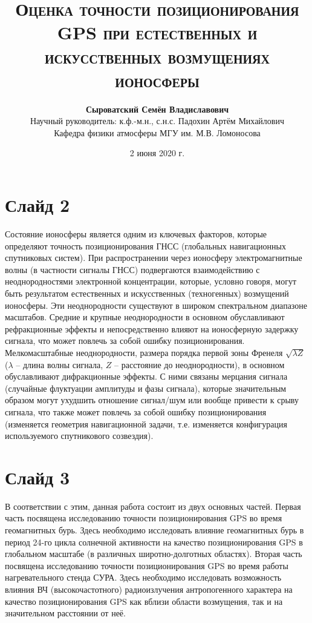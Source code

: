 \documentclass[a4paper,14pt]{extarticle}
\title{\textsc{Оценка точности позиционирования GPS при естественных и искусственных возмущениях ионосферы}}
\author{\textbf{Сыроватский Семён Владиславович} \\ {\small Научный руководитель: к.ф.-м.н., с.н.с. Падохин Артём Михайлович} \\[1em] Кафедра физики атмосферы МГУ им. М.В. Ломоносова}
\date{2 июня 2020 г.}
\begin{document}
\maketitle
\section*{Слайд 2}
Состояние ионосферы является одним из ключевых факторов, которые определяют точность позиционирования ГНСС (глобальных навигационных спутниковых систем).
При распространении через ионосферу электромагнитные волны (в частности сигналы ГНСС) подвергаются взаимодействию с неоднородностями электронной концентрации, которые, условно говоря, могут быть результатом естественных и искусственных (техногенных) возмущений ионосферы.
Эти неоднородности существуют в широком спектральном диапазоне масштабов.
Средние и крупные неоднородности в основном обуславливают рефракционные эффекты и непосредственно влияют на ионосферную задержку сигнала, что может повлечь за собой ошибку позиционирования.
Мелкомасштабные неоднородности, размера порядка первой зоны Френеля $\sqrt{\lambda Z}$ ($\lambda$ -- длина волны сигнала, $Z$ -- расстояние до неоднородности), в основном обуславливают дифракционные эффекты.
С ними связаны мерцания сигнала (случайные флуктуации амплитуды и фазы сигнала), которые значительным образом могут ухудшить отношение сигнал/шум или вообще привести к срыву сигнала, что также может повлечь за собой ошибку позиционирования (изменяется геометрия навигационной задачи, т.е. изменяется конфигурация используемого спутникового созвездия).

\section*{Слайд 3}
В соответствии с этим, данная работа состоит из двух основных частей. 
Первая часть посвящена исследованию точности позиционирования GPS во время геомагнитных бурь.
Здесь необходимо исследовать влияние геомагнитных бурь в период 24-го цикла солнечной активности на качество позиционирования GPS в глобальном масштабе (в различных широтно-долготных областях).
Вторая часть посвящена исследованию точности позиционирования GPS во время работы нагревательного стенда СУРА.
Здесь необходимо исследовать возможность влияния ВЧ (высокочастотного) радиоизлучения антропогенного характера на качество позиционирования GPS как вблизи области возмущения, так и на значительном расстоянии от неё.
\end{document}

